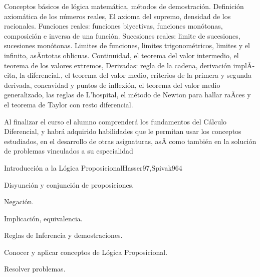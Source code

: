 \begin{syllabus}


\begin{justification}
Conceptos básicos de lógica matemática, métodos de demostración. Definición axiomática de los números reales, El axioma del supremo, densidad de los racionales. Funciones reales: funciones biyectivas, funciones monótonas, composición e inversa de una función. Sucesiones reales: limite de sucesiones, sucesiones monótonas.  Limites de funciones, limites trigonométricos, limites y el infinito, asÃ­ntotas  oblicuas. Continuidad, el teorema del valor intermedio, el teorema de los valores extremos, Derivadas: regla de la cadena, derivación implÃ­cita, la diferencial., el teorema del valor medio, criterios de la primera y segunda derivada, concavidad y puntos de inflexión, el teorema del valor medio generalizado, las reglas de L'hospital, el método de Newton para hallar raÃ­ces y el  teorema de Taylor  con resto diferencial.
\end{justification}

\begin{goals}
\item Al finalizar el curso el alumno comprenderá los fundamentos del Cálculo Diferencial, y habrá adquirido habilidades que le permitan usar los conceptos estudiados, en el desarrollo de otras asignaturas, asÃ­ como también en la solución de problemas vinculados a su especialidad 
\end{goals}

\begin{outcomes}
\end{outcomes}

\begin{unit}{Introducción a la Lógica Proposicional}{Hasser97,Spivak96}{4}
\begin{topics}
      \item Disyunción y conjunción de proposiciones.
      \item Negación.
      \item Implicación, equivalencia.
      \item Reglas de Inferencia y demostraciones.
   \end{topics}

   \begin{unitgoals}
      \item Conocer y aplicar conceptos de Lógica Proposicional.
	\item Resolver problemas.
   \end{unitgoals}
\end{unit}


\end{syllabus}

